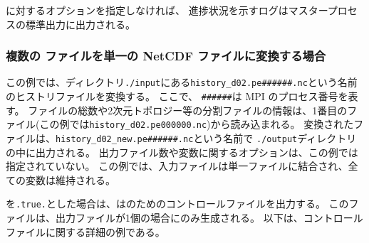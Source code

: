 に対するオプションを指定しなければ、
進捗状況を示すログはマスタープロセスの標準出力に出力される。

\subsubsection{複数の \scalenetcdf ファイルを単一の NetCDF ファイルに変換する場合}


この例では、ディレクトリ\verb|./input|にある\verb|history_d02.pe######.nc|という名前のヒストリファイルを変換する。
ここで、 \verb|######|は MPI のプロセス番号を表す。
ファイルの総数や2次元トポロジー等の分割ファイルの情報は、1番目のファイル(この例では\verb|history_d02.pe000000.nc|)から読み込まれる。
変換されたファイルは、\verb|history_d02_new.pe######.nc|という名前で \verb|./output|ディレクトリの中に出力される。
出力ファイル数や変数に関するオプションは、この例では指定されていない。
この例では、入力ファイルは単一ファイルに結合され、全ての変数は維持される。

を\verb|.true.|とした場合は、\sno は{\grads}のためのコントロールファイルを出力する。
このファイルは、出力ファイルが1個の場合にのみ生成される。
以下は、コントロールファイルに関する詳細の例である。

